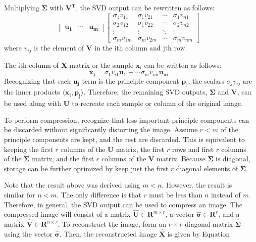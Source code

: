 \documentclass[conference]{IEEEtran}
\begin{document}
	Multiplying $\mathbf{\Sigma}$ with $\mathbf{V^T}$, the SVD output can be rewritten as follows:
	\begin{equation}
		\begin{bmatrix}
			\mathbf{u_1} & \cdots & \mathbf{u_m}
		\end{bmatrix}\begin{bmatrix}
			\sigma_1v_{11} & \sigma_1v_{21} & \cdots & \sigma_1v_{n1}\\
			\sigma_2v_{12} & \sigma_1v_{22} & \cdots & \sigma_2v_{n2}\\
			\vdots & \vdots & \ddots & \vdots\\
			\sigma_mv_{1m} & \sigma_mv_{2m} & \cdots & \sigma_mv_{nm}
		\end{bmatrix}
	\end{equation}
    	where $v_{ij}$ is the element of $\mathbf{V}$ in the ith column and jth row.
    	
    	The ith column of $\mathbf{X}$ matrix or the sample $\mathbf{x_i}$ can be written as follows:
	\begin{equation*}
		\mathbf{x_i} = \sigma_1v_{i1}\mathbf{u_1} + \cdots \sigma_mv_{im}\mathbf{u_m}
	\end{equation*}   	
    	Recognizing that each $\mathbf{u_j}$ term is the principle component $\mathbf{p_j}$, the scalars $\sigma_jv_{ij}$ are the inner products $\langle \mathbf{x_i}, \mathbf{p_j}\rangle$. Therefore, the remaining SVD outputs, $\mathbf{\Sigma}$ and $\mathbf{V}$, can be used along with $\mathbf{U}$ to recreate each sample or column of the original image.  
    	
    	To perform compression, recognize that less important principle components can be discarded without significantly distorting the image.  Assume $r < m$ of the principle components are kept, and the rest are discarded. This is equivalent to keeping the first $r$ columns of the $\mathbf{U}$ matrix, the first $r$ rows and first $r$ columns of the $\mathbf{\Sigma}$ matrix, and the first $r$ columns of the $\mathbf{V}$ matrix. Because $\mathbf{\Sigma}$ is diagonal, storage can be further optimized by keep just the first $r$ diagonal elements of $\mathbf{\Sigma}$.
    	
    Note that the result above was derived using $m < n$. However, the result is similar for $n < m$. The only difference is that $r$ must be less than $n$ instead of $m$. Therefore, in general, the SVD output can be used to compress an image. The compressed image will consist of a matrix $\mathbf{\hat{U}} \in \mathbf{R}^{m \times r}$, a vector $\mathbf{\hat{\sigma}} \in \mathbf{R}^{r}$, and a matrix $\mathbf{\hat{V}} \in \mathbf{R}^{n \times r}$. To reconstruct the image, form an $r \times r$ diagonal matrix $\mathbf{\hat{\Sigma}}$ using the vector $\mathbf{\hat{\sigma}}$. Then, the reconstructed image $\mathbf{\hat{X}}$ is given by Equation \label{eq:imgrecon}
\end{document}
